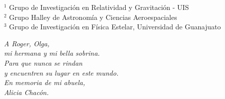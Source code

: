\documentclass[12pt,oneside,openany,letter]{book}
\begin{document}
\begin{titlepage}
{}

\vfill


\vfill




\vfill



\vfill
{\Large $^1$ Grupo de Investigaci\'on en Relatividad y Gravitaci\'on - UIS} \\
{\Large $^2$ Grupo Halley de Astronom\'ia y Ciencias Aeroespaciales} \\
{\Large $^3$ Grupo de Investigación en Física Estelar, Universidad de Guanajuato}

\vfill

\end{titlepage}
\newpage

\newpage
\begin{flushright}
\vspace{5 cm}
\textit{A Roger, Olga, \\
mi hermana y mi bella sobrina.\\
Para que nunca se rindan \\
y encuentren su lugar en este mundo.\\
En memoria de mi abuela,\\
Alicia Chacón.\\}

\vspace{0.5cm}

\end{flushright}
\end{document}
